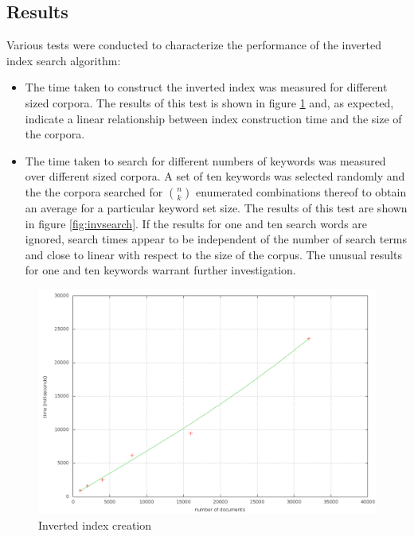 \documentclass[10pt]{report}
\begin{document}
\subsection*{Results}
Various tests were conducted to characterize the performance of the
inverted index search algorithm:

\begin{itemize}
\item The time taken to construct the inverted index was measured for
  different sized corpora. The results of this test is shown in figure
  \ref{fig:invscan} and, as expected, indicate a linear relationship
  between index construction time and the size of the corpora.

\item The time taken to search for different numbers of keywords was
  measured over different sized corpora. A set of ten keywords was
  selected randomly and the the corpora searched for ${n \choose k}$
  enumerated combinations thereof to obtain an average for a
  particular keyword set size. The results of this test are shown in
  figure \ref{fig:invsearch}. If the results for one and ten search
  words are ignored, search times appear to be independent of the
  number of search terms and close to linear with respect to the size
  of the corpus. The unusual results for one and ten keywords warrant
  further investigation.
\end{itemize}


\begin{figure}
  \begin{center}
	\includegraphics[width=\textwidth,height=!]{invscan}
  \end{center}
  \caption{Inverted index creation}
  \label{fig:invscan}
\end{figure} 
\end{document}

